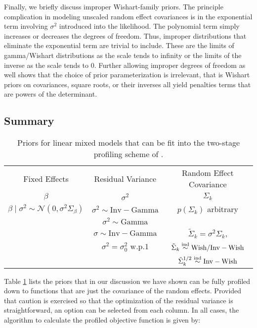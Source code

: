 \documentclass[article,shortnames]{jss}
\begin{document}
Finally, we briefly discuss improper Wishart-family priors. The principle
complication in modeling unscaled random effect covariances is in
the exponential term involving $\sigma^2$ introduced into the
likelihood. The polynomial term simply increases or decreases the
degrees of freedom. Thus, improper distributions that
eliminate the exponential term are trivial to include. These are the
limits of gamma/Wishart distributions as the scale tends to infinity
or the limits of the inverse as the scale tends to 0. Further allowing
improper degrees of freedom as well shows that the choice of prior
parameterization is irrelevant, that is Wishart priors on covariances, square
roots, or their inverses all yield penalties terms that are powers of
the determinant.

\subsection{Summary}

\begin{table}
  \begin{center}
  \begin{tabular}{ccc}
    Fixed Effects & Residual Variance & Random Effect Covariance \\
    $\beta$ & $\sigma^2$ & $\Sigma_k$ \\ \hline
    $\beta \mid \sigma^2 \sim \mathcal{N}(0, \sigma^2\Sigma_\beta)$ & 
    $\sigma^2 \sim \mathrm{Inv-Gamma}$ & $p(\Sigma_k)$ arbitrary \\
    & $\sigma^2 \sim \mathrm{Gamma}$ \\
    & $\sigma \sim \mathrm{Inv-Gamma}$ & $\tilde\Sigma_k =
    \sigma^2\Sigma_k$, \\
    & $\sigma^2 = \sigma^2_0 \text{ w.p.} 1$ & $\tilde\Sigma_k \overset{\rm ind}{\sim} {\rm Wish/Inv-Wish}$ \\
    & & $\tilde\Sigma_k^{1/2} \overset{\rm ind}{\sim} {\rm Inv-Wish}$
  \end{tabular}
\end{center}
  \caption{Priors for linear mixed models that can be fit into the
    two-stage profiling scheme of .}
  \label{tab:easyPriors}
\end{table}

Table \ref{tab:easyPriors} lists the priors that in our discussion we have shown can be
fully profiled down to functions that are just the covariance of the
random effects. Provided that caution is exercised so
that the optimization of the residual variance is straightforward, an option can be selected
from each column. In all cases, the algorithm to calculate the
profiled objective function is given by:
\end{document}
